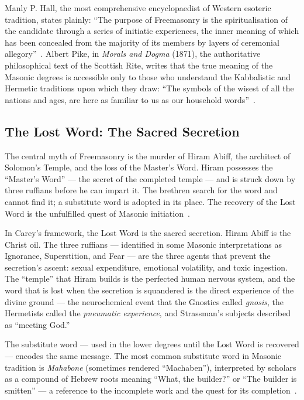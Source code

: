 \documentclass[12pt, a4paper]{article}
\begin{document}
Manly P. Hall, the most comprehensive encyclopaedist of Western esoteric
tradition, states plainly: ``The purpose of Freemasonry is the
spiritualisation of the candidate through a series of initiatic experiences,
the inner meaning of which has been concealed from the majority of its members
by layers of ceremonial allegory''~\autocite[338]{hall1928}. Albert Pike, in
\emph{Morals and Dogma} (1871), the authoritative philosophical text of the
Scottish Rite, writes that the true meaning of the Masonic degrees is
accessible only to those who understand the Kabbalistic and Hermetic traditions
upon which they draw: ``The symbols of the wisest of all the nations and ages,
are here as familiar to us as our household words''~\autocite[625]{pike1871}.

\subsection{The Lost Word: The Sacred Secretion}

The central myth of Freemasonry is the murder of Hiram Abiff, the architect of
Solomon's Temple, and the loss of the Master's Word. Hiram possesses the
``Master's Word'' — the secret of the completed temple — and is struck down
by three ruffians before he can impart it. The brethren search for the word
and cannot find it; a substitute word is adopted in its place. The recovery of
the Lost Word is the unfulfilled quest of Masonic
initiation~\autocite[210]{mackey1874}.

In Carey's framework, the Lost Word is the sacred secretion. Hiram Abiff is
the Christ oil. The three ruffians — identified in some Masonic interpretations
as Ignorance, Superstition, and Fear — are the three agents that prevent the
secretion's ascent: sexual expenditure, emotional volatility, and toxic
ingestion. The ``temple'' that Hiram builds is the perfected human
nervous system, and the word that is lost when the secretion is squandered is
the direct experience of the divine ground — the neurochemical event that the
Gnostics called \emph{gnosis}, the Hermetists called the \emph{pneumatic
experience}, and Strassman's subjects described as ``meeting God.''

The substitute word — used in the lower degrees until the Lost Word is
recovered — encodes the same message. The most common substitute word in
Masonic tradition is \emph{Mahabone} (sometimes rendered ``Machaben''),
interpreted by scholars as a compound of Hebrew roots meaning ``What, the
builder?'' or ``The builder is smitten'' — a reference to the incomplete work
and the quest for its completion~\autocite[439]{mackey1874}.
\end{document}
